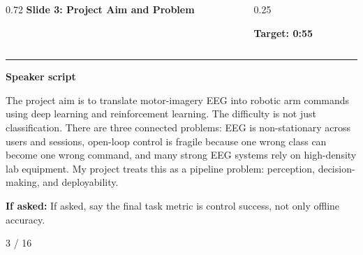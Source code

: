 \documentclass[aspectratio=169,10pt]{beamer}
\begin{document}
\begin{frame}[plain]
\vspace*{0.16cm}
\begin{columns}[T,totalwidth=\textwidth]
\begin{column}{0.72\textwidth}
{\fontsize{17}{18.5}\selectfont\bfseries Slide 3: Project Aim and Problem}
\end{column}
\begin{column}{0.25\textwidth}
\raggedleft
\colorbox{noteCream}{\parbox{0.88\linewidth}{\centering\bfseries Target: 0:55}}
\end{column}
\end{columns}
\vspace{0.10cm}
{\color{uomPurple}\rule{\textwidth}{1.2pt}}
\vspace{0.18cm}
{\color{uomPurple}\bfseries Speaker script}
\vspace{0.06cm}
\setlength{\fboxsep}{6pt}
\noindent\colorbox{panelGrey}{\begin{minipage}{0.94\textwidth}
\justifying\fontsize{11.0}{13.4}\selectfont
The project aim is to translate motor-imagery EEG into robotic arm commands using deep learning and reinforcement learning. The difficulty is not just classification. There are three connected problems: EEG is non-stationary across users and sessions, open-loop control is fragile because one wrong class can become one wrong command, and many strong EEG systems rely on high-density lab equipment. My project treats this as a pipeline problem: perception, decision-making, and deployability.
\end{minipage}}
\vspace{0.22cm}
\noindent\colorbox{noteCream}{\begin{minipage}{0.94\textwidth}
\fontsize{9.6}{11.6}\selectfont
{\bfseries If asked:} If asked, say the final task metric is control success, not only offline accuracy.
\end{minipage}}
\vfill
\hfill{\color{textDark}\scriptsize 3 / 16}
\end{frame}
\end{document}
